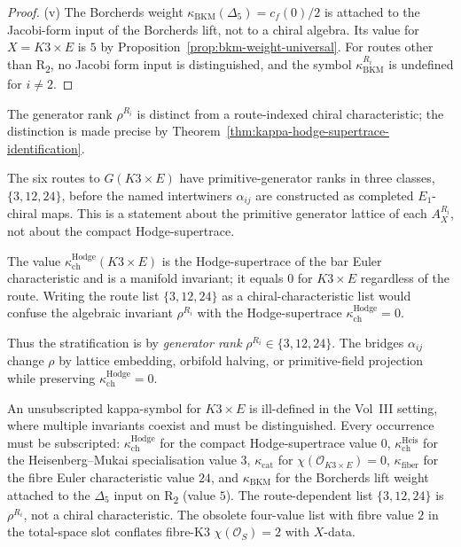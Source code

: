 \begin{proof}
(v) The Borcherds weight $\kappa_{\mathrm{BKM}}(\Delta_5) = c_f(0)/2$ is attached to the Jacobi-form input of the Borcherds lift, not to a chiral algebra. Its value for $X = K3 \times E$ is $5$ by Proposition~\ref{prop:bkm-weight-universal}. For routes other than R\textsubscript{2}, no Jacobi form input is distinguished, and the symbol $\kappa_{\mathrm{BKM}}^{R_i}$ is undefined for $i \neq 2$.
\end{proof}

\begin{remark}
\label{rem:rho-vs-kappa-ch-disambiguation}
The generator rank $\rho^{R_i}$ is distinct from a route-indexed chiral characteristic; the distinction is made precise by Theorem~\ref{thm:kappa-hodge-supertrace-identification}.

The six routes to $G(K3 \times E)$ have primitive-generator ranks in
three classes, $\{3, 12, 24\}$, before the named intertwiners
$\alpha_{ij}$ are constructed as completed \(E_1\)-chiral maps. This is
a statement about the primitive generator lattice of each
$A_X^{R_i}$, not about the compact Hodge-supertrace.

The value $\kappa_{\mathrm{ch}}^{\mathrm{Hodge}}(K3\times E)$ is the Hodge-supertrace of
the bar Euler characteristic and is a manifold invariant; it equals $0$
for $K3 \times E$ regardless of the route. Writing the route list
$\{3, 12, 24\}$ as a chiral-characteristic list would confuse the
algebraic invariant $\rho^{R_i}$ with the Hodge-supertrace
$\kappa_{\mathrm{ch}}^{\mathrm{Hodge}} = 0$.

Thus the stratification is by \emph{generator rank}
$\rho^{R_i} \in \{3, 12, 24\}$. The bridges $\alpha_{ij}$ change
$\rho$ by lattice embedding, orbifold halving, or primitive-field
projection while preserving $\kappa_{\mathrm{ch}}^{\mathrm{Hodge}} = 0$.
\end{remark}

\begin{remark}
\label{rem:kappa-k3e-never-bare}
An unsubscripted kappa-symbol for \(K3 \times E\) is ill-defined in the
Vol~III setting, where multiple invariants coexist and must be
distinguished. Every occurrence must be subscripted:
$\kappa_{\mathrm{ch}}^{\mathrm{Hodge}}$ for the compact Hodge-supertrace value $0$,
$\kappa_{\mathrm{ch}}^{\mathrm{Heis}}$ for the Heisenberg--Mukai
specialisation value $3$, $\kappa_{\mathrm{cat}}$ for
\(\chi(\mathcal O_{K3\times E})=0\), $\kappa_{\mathrm{fiber}}$ for the
fibre Euler characteristic value $24$, and $\kappa_{\mathrm{BKM}}$ for
the Borcherds lift weight attached to the $\Delta_5$ input on R\textsubscript{2} (value $5$).
The route-dependent list $\{3,12,24\}$ is $\rho^{R_i}$, not a chiral
characteristic. The obsolete four-value list with fibre value $2$ in the
total-space slot conflates fibre-K3 $\chi(\mathcal{O}_S) = 2$ with
$X$-data.
\end{remark}

